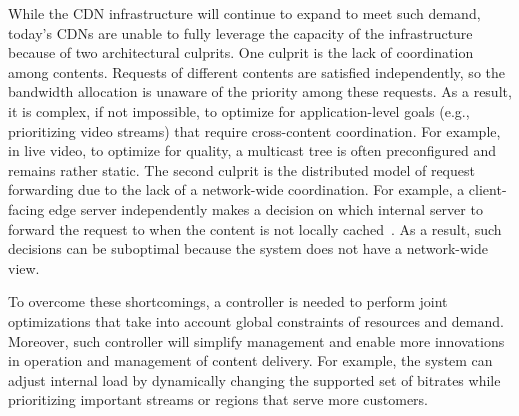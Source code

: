 While the CDN infrastructure will continue to expand to
meet such demand, today's CDNs are unable to fully leverage the capacity of the infrastructure because of two architectural culprits. One culprit is the lack of coordination among contents. Requests of different contents are satisfied independently, so the bandwidth allocation is unaware of the priority among these requests. As a result, it is complex, if not impossible, to optimize for application-level goals (e.g., prioritizing video streams) that require cross-content coordination. For example, in live video, to optimize for quality, a multicast tree is often preconfigured and remains rather static. The second culprit is the distributed model of request forwarding due to the lack of a network-wide coordination. 
For example, a client-facing edge server independently
makes a decision on which internal server to forward the
request to when the content is not locally
cached~\cite{akamai-live,coral,codeen}.
As a result, such decisions can be suboptimal because the system
does not have a network-wide view. 

To overcome these shortcomings, a controller is needed to perform joint optimizations that take into account global constraints of resources and demand. Moreover, such controller will simplify management and enable more innovations in operation and management of content delivery. For example, the system can adjust internal load by dynamically changing the supported set of bitrates while prioritizing important streams or regions that serve more customers. 






